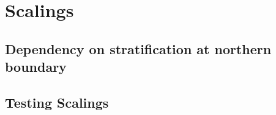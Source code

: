 % 
\section{Scalings}
\subsection{Dependency on stratification at northern boundary}
\subsection{Testing Scalings}